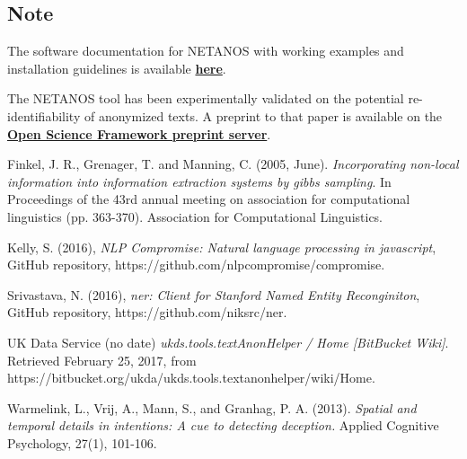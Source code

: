 \documentclass{article}
\begin{document}
\subsection*{Note}
The software documentation for NETANOS with working examples and installation guidelines is available \href{https://github.com/ben-aaron188/netanos/blob/master/README.md}{\textbf{here}}. 

\noindent The NETANOS tool has been experimentally validated on the potential re-identifiability of anonymized texts. A preprint to that paper is available on the \href{https://osf.io/w9nhb/}{\textbf{Open Science Framework preprint server}}.

\begin{thebibliography}{4}

Finkel, J. R., Grenager, T. and Manning, C. (2005, June). \emph{Incorporating non-local information into information extraction systems by gibbs sampling}. In Proceedings of the 43rd annual meeting on association for computational linguistics (pp. 363-370). Association for Computational Linguistics.

Kelly, S. (2016), \emph{NLP Compromise: Natural language processing in javascript}, GitHub repository, https://github.com/nlpcompromise/compromise.

Srivastava, N. (2016), \emph{ner: Client for Stanford Named Entity Reconginiton}, GitHub repository, https://github.com/niksrc/ner.

UK Data Service (no date) \emph{ukds.tools.textAnonHelper / Home [BitBucket Wiki]}. Retrieved February 25, 2017, from https://bitbucket.org/ukda/ukds.tools.textanonhelper/wiki/Home.

Warmelink, L., Vrij, A., Mann, S., and Granhag, P. A. (2013). \emph{Spatial and temporal details in intentions: A cue to detecting deception.} Applied Cognitive Psychology, 27(1), 101-106.

\end{thebibliography}
\end{document}
